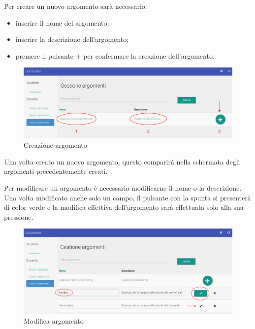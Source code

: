 \documentclass[12pt,a4paper]{article}
\begin{document}

		\par Per creare un nuovo argomento sarà necessario:
		\begin{itemize}
			\item inserire il nome del argomento;
			\item inserire la descrizione dell'argomento;
			\item premere il pulsante $\boldsymbol{+}$ per confermare la creazione dell'argomento.
		\end{itemize}
		
			\begin{figure}[H]	
				\centering
				\includegraphics[width=1.0\linewidth]{../img/screenshot/aggiungiArgomento.png}
				\caption{Creazione argomento}
				\label{Creazione argomento}
			\end{figure}
		
		Una volta creato un nuovo argomento, questo comparirà nella schermata degli argomenti precedentemente creati.
		
		\par Per modificare un argomento è necessario modificarne il nome o la descrizione. Una volta modificato anche solo un campo, il pulsante con la spunta si presenterà di color verde e la modifica effettiva dell'argomento sarà effettuata solo alla sua pressione. \\
		
			\begin{figure}[H]	
				\centering
				\includegraphics[width=1.0\linewidth]{../img/screenshot/modificaArgomento.png}
				\caption{Modifica argomento}
				\label{Modifica argomento}
			\end{figure}
		
\end{document}
